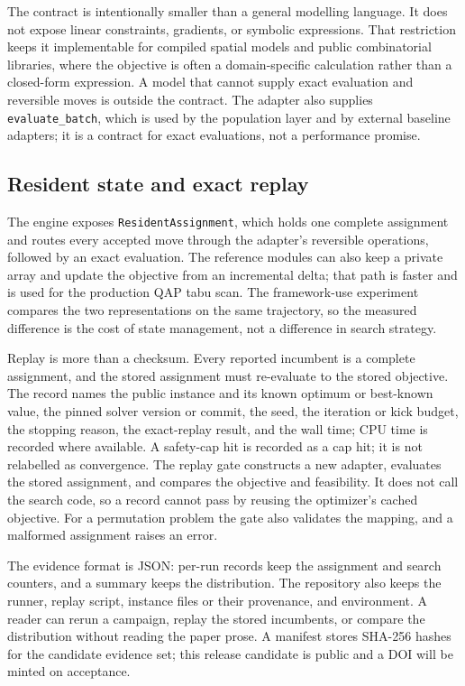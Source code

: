 \documentclass[10pt]{article}
\begin{document}
The contract is intentionally smaller than a general modelling language. It does not expose linear
constraints, gradients, or symbolic expressions. That restriction keeps it implementable for
compiled spatial models and public combinatorial libraries, where the objective is often a
domain-specific calculation rather than a closed-form expression. A model that cannot supply exact
evaluation and reversible moves is outside the contract. The adapter also supplies
\texttt{evaluate\_batch}, which is used by the population layer and by external baseline adapters;
it is a contract for exact evaluations, not a performance promise.

\subsection{Resident state and exact replay}

The engine exposes \texttt{ResidentAssignment}, which holds one complete assignment and routes every
accepted move through the adapter's reversible operations, followed by an exact evaluation. The
reference modules can also keep a private array and update the objective from an incremental delta;
that path is faster and is used for the production QAP tabu scan. The framework-use experiment
compares the two representations on the same trajectory, so the measured difference is the cost of
state management, not a difference in search strategy.

Replay is more than a checksum. Every reported incumbent is a complete assignment, and the stored
assignment must re-evaluate to the stored objective. The record names the public instance and its
known optimum or best-known value, the pinned solver version or commit, the seed, the iteration or
kick budget, the stopping reason, the exact-replay result, and the wall time; CPU time is recorded where available. A safety-cap
hit is recorded as a cap hit; it is not relabelled as convergence. The replay gate constructs a new
adapter, evaluates the stored assignment, and compares the objective and feasibility. It does not
call the search code, so a record cannot pass by reusing the optimizer's cached objective. For a
permutation problem the gate also validates the mapping, and a malformed assignment raises an error.

The evidence format is JSON: per-run records keep the assignment and search counters, and a summary
keeps the distribution. The repository also keeps the runner, replay script, instance files or their
provenance, and environment. A reader can rerun a campaign, replay the stored incumbents, or compare
the distribution without reading the paper prose. A manifest stores SHA-256 hashes for the candidate
evidence set; this release candidate is public and a DOI will be minted on acceptance.
\end{document}
